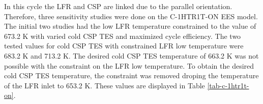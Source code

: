 \begin{paracol}{2}
\linenumbers
\switchcolumn

In this cycle the LFR and CSP are linked due to the parallel orientation. Therefore, three sensitivity studies were done on the C-1HTR1T-ON EES model. The initial two studies had the low LFR temperature constrained to the value of 673.2 K with varied cold CSP TES and maximized cycle efficiency. The two tested values for cold CSP TES with constrained LFR low temperature were 683.2 K and 713.2 K. The desired cold CSP TES temperature of 663.2 K was not possible with the constraint on the LFR low temperature. To obtain the desired cold CSP TES temperature, the constraint was removed droping the temperature of the LFR inlet to 653.2 K. These values are displayed in Table \ref{tab-c-1htr1t-on}.


\end{paracol}
